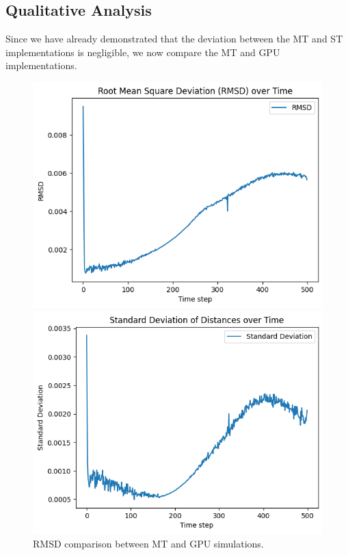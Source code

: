 \documentclass[english,11pt]{article}
\begin{document}
\subsection{Qualitative Analysis}

Since we have already demonstrated that the deviation between the MT and ST implementations is negligible, we now compare the MT and GPU implementations. 


\begin{figure}[h!]
    \centering
    \begin{minipage}{0.3\textwidth}
        \centering
        \includegraphics[width=\textwidth]{graph/RMSD_CPU-GPU.png}
        \caption{RMSD comparison between MT and GPU simulations.}
        \label{fig:rmsd_gpu}
    \end{minipage}\hfill
    \begin{minipage}{0.3\textwidth}
        \centering
        \includegraphics[width=\textwidth]{graph/std-dev_CPU_GPU.png}

\end{minipage}
\end{figure}
\end{document}
